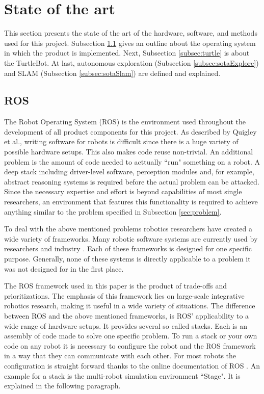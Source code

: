 \documentclass{ba-kecs}
\begin{document}
\section{State of the art}
This section presents the state of the art of the hardware, software, and methods used for this project. Subsection \ref{subsec:ros} gives an outline about the operating system in which the product is implemented. Next, Subsection \ref{subsec:turtle} is about the TurtleBot. At last, autonomous exploration (Subsection \ref{subsec:sotaExplore}) and SLAM (Subsection \ref{subsec:sotaSlam}) 
\label{sec:sota} are defined and explained.
\subsection{ROS}
\label{subsec:ros}
The Robot Operating System (ROS) \cite{Quigley} is the environment used throughout the development of all product components for this project. As described by Quigley et al., writing software for robots is difficult since there is a huge variety of possible hardware setups. This also makes code reuse non-trivial. An additional problem is the amount of code needed to acttually ``run" something on a robot. A deep stack including driver-level software, perception modules and, for example, abstract reasoning systems is required before the actual problem can be attacked. Since the necessary expertise and effort is beyond capabilities of most single researchers, an environment that features this functionality is required to achieve anything similar to the problem specified in Subsection \ref{sec:problem}.

To deal with the above mentioned problems robotics researchers have created a wide variety of frameworks. Many robotic software systems are currently used by researchers and industry \cite{Kramer}. Each of these frameworks is designed for one specific purpose. Generally, none of these systems is directly applicable to a problem it was not designed for in the first place.

The ROS framework used in this paper is the product of trade-offs and prioritizations. The emphasis of this framework lies on large-scale integrative robotics research, making it useful in a wide variety of situations. The difference between ROS and the above mentioned frameworks, is ROS' applicability to a wide range of hardware setups.  It provides several so called stacks. Each is an assembly of code made to solve one specific problem. To run a stack or your own code on any robot it is necessary to configure the robot and the ROS framework in a way that they can communicate with each other. For most robots the configuration is straight forward thanks to the online documentation of ROS \citep{Roswiki}.  An example for a stack is the multi-robot simulation environment ``Stage". It is explained in the following paragraph.
\end{document}
